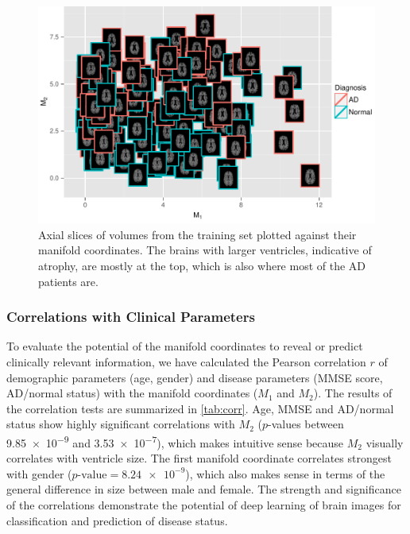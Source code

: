 \begin{figure}[tb!] \centering
\includegraphics[width=\textwidth]{figures/scatterimage}
\caption[Axial slices of volumes from the training set plotted against their
manifold coordinates]{Axial slices of volumes from the training set plotted
against their manifold coordinates. The brains with larger ventricles, indicative of atrophy,
are mostly at the top, which is also where most of the AD patients are.}
\label{fig:scatter}
\end{figure}

\subsubsection{Correlations with Clinical Parameters}

To evaluate the potential of the manifold coordinates to reveal or predict
clinically relevant information, we have calculated the Pearson correlation $r$
of demographic parameters (age, gender) and disease parameters (MMSE score,
AD/normal status) with the manifold coordinates ($M_1$ and $M_2$). The results
of the correlation tests are summarized in \ref{tab:corr}. Age, MMSE and
AD/normal status show highly significant correlations with $M_2$ ($p$-values
between \num{9.85e-9} and \num{3.53e-7}), which makes intuitive sense because
$M_2$ visually correlates with ventricle size. The first manifold coordinate
correlates strongest with gender ($p\text{-value} = \num{8.24e-9}$), which also
makes sense in terms of the general difference in size between male and female.
The strength and significance of the correlations demonstrate the potential of
deep learning of brain images for classification and prediction of disease
status.

